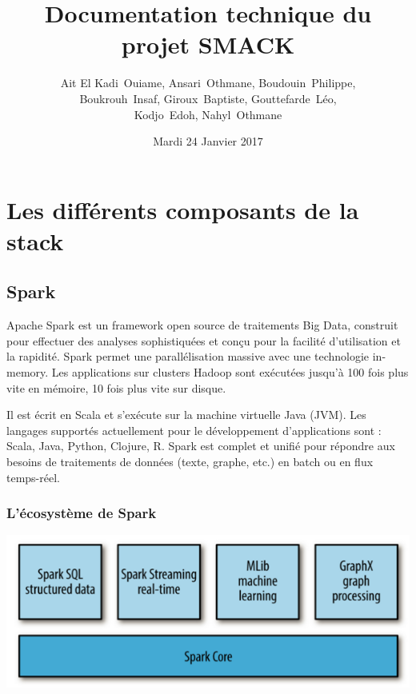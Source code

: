 \documentclass[a4paper, 11pt, titlepage]{article}
\title {{ {\huge Documentation technique du projet SMACK }} }
\author{%
    {\sc Ait El Kadi}~Ouiame,
    {\sc Ansari}~Othmane,
    {\sc Boudouin}~Philippe,\\
    {\sc Boukrouh}~Insaf,
    {\sc Giroux}~Baptiste,
    {\sc Gouttefarde}~Léo,\\
    {\sc Kodjo}~Edoh,
    {\sc Nahyl}~Othmane
}
\date{Mardi 24 Janvier 2017}
\begin{document}
\pagestyle{fancy}
\maketitle

\setcounter{tocdepth}{2}

\tableofcontents
\newpage

\section {Les différents composants de la stack}

\subsection {Spark}

Apache Spark est un framework open source de traitements Big Data, construit pour effectuer des analyses sophistiquées et conçu pour la facilité d'utilisation et la rapidité. 
Spark permet une parallélisation massive avec une technologie in-memory. Les applications sur clusters Hadoop sont exécutées jusqu'à 100 fois plus vite en mémoire, 10 fois plus vite sur disque.

Il est écrit en Scala et s'exécute sur la machine virtuelle Java (JVM). Les langages supportés actuellement pour le développement d'applications sont : Scala, Java, Python, Clojure, R. Spark est complet et unifié pour répondre aux besoins de traitements de données (texte, graphe, etc.) en batch ou en flux temps-réel.


\subsubsection* {L'écosystème de Spark}

\begin{center}
\includegraphics[scale=0.5]{res/eco_spark.png}
\end{center}
\end{document}

